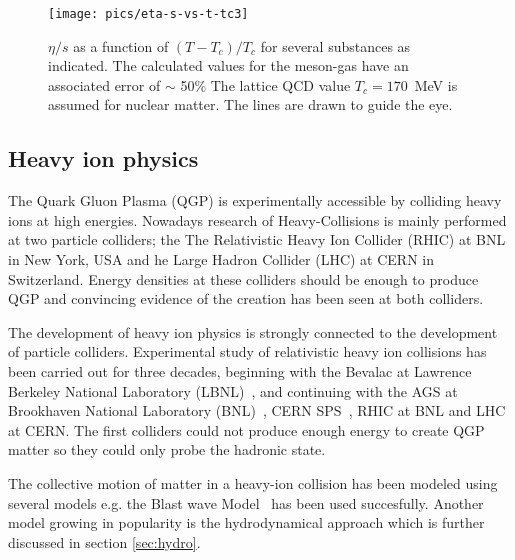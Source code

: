 \begin{figure}[htb]
\centering
\texttt{[image: pics/eta-s-vs-t-tc3]}
\caption[$\eta/s$ vs $(T-T_c)/T_c$]{\label{fig3}$\eta/s$ as a function of $(T-T_c)/T_c$ for several substances as indicated.
	The calculated values for the meson-gas have an associated error 
	of $\sim$ 50\% %
	The lattice QCD value $T_c = 170$~MeV %
	is assumed for nuclear matter. The lines are drawn to guide the eye.~\cite{PhysRevLett.98.092301}
}
\label{fig:etas}

\end{figure}

\FloatBarrier
\pagebreak
\subsection{Heavy ion physics}
The Quark Gluon Plasma (QGP) is experimentally accessible by colliding heavy ions at high energies. Nowadays research of Heavy-Collisions is mainly performed at two particle colliders; the The Relativistic Heavy Ion Collider (RHIC) at BNL in New York, USA and he Large Hadron Collider (LHC) at CERN in Switzerland. Energy densities at these colliders should be enough to produce QGP and convincing evidence of the creation has been seen at both colliders.

The development of heavy ion physics is strongly connected to the development of particle colliders. Experimental study of relativistic heavy ion collisions has been carried out for three decades, beginning with the Bevalac at Lawrence Berkeley National Laboratory (LBNL)~\cite{Lofgren_1975}, and continuing with the AGS at Brookhaven National Laboratory (BNL)~\cite{Barton:1987}, CERN SPS~\cite{Vitev:2002pf}, RHIC at BNL and LHC at CERN. The first colliders could not produce enough energy to create QGP matter so they could only probe the hadronic state. 

The collective motion of matter in a heavy-ion collision has been modeled using several models e.g. the Blast wave Model~\cite{PhysRevC.84.064905} has been used succesfully. Another model growing in popularity is the hydrodynamical approach which is further discussed in section \ref{sec:hydro}.

